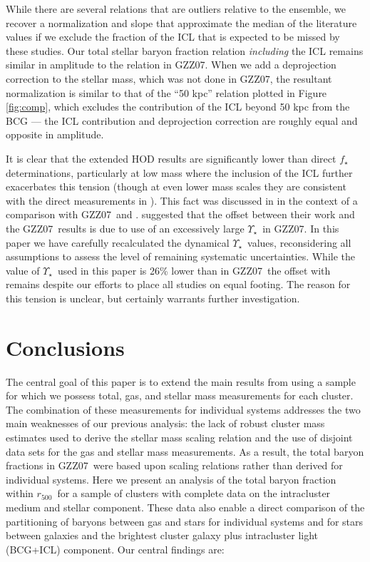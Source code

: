 \documentclass[preprint]{emulateapj}
\newcommand\rfive{$r_{500}$}
\newcommand\ptwo{GZZ07}
\newcommand{\mlrat}{$\Upsilon_\star$}
\begin{document}
While there are several relations that are outliers relative to the
ensemble, we recover a normalization and slope that approximate the
median of the literature values if we exclude the fraction of the ICL
that is expected to be missed by these studies. Our total stellar
baryon fraction relation \emph{including} the ICL remains similar in
amplitude to the relation in \ptwo. When we add a deprojection
correction to the stellar mass, which was not done in \ptwo, the
resultant normalization is similar to that of the ``50 kpc'' relation
plotted in Figure \ref{fig:comp}, which excludes the contribution of
the ICL beyond 50 kpc from the BCG --- the ICL contribution and
deprojection correction are roughly equal and opposite in amplitude.

It is clear that the \citet{leauthaud2012} extended HOD results are
significantly lower than direct $f_\star$ determinations, particularly
at low mass where the inclusion of the ICL further exacerbates this
tension (though at even lower mass scales they are consistent with the
direct measurements in \citet{leauthaud2012}).  This fact was
discussed in \citet{leauthaud2012} in the context of a comparison with
\ptwo\ and \citet{giodini2009}.  \citet{leauthaud2012} suggested that
the offset between their work and the \ptwo\ results is due to use of
an excessively large \mlrat\ in \ptwo.  In this paper we have
carefully recalculated the dynamical \mlrat\ values, reconsidering all
assumptions to assess the level of remaining systematic
uncertainties. While the value of \mlrat\ used in this paper is 26\%
lower than in \ptwo\, the offset with \citet{leauthaud2012} remains
despite our efforts to place all studies on equal footing. The reason
for this tension is unclear, but certainly warrants further
investigation.


\section{Conclusions}
\label{sec:summary}

The central goal of this paper is to extend the main
results from \citet{gonzalez2007} using a sample for which we possess
total, gas, and stellar mass measurements for each cluster. The
combination of these measurements for individual systems addresses the
two main weaknesses of our previous analysis: the lack of robust
cluster mass estimates used to derive the stellar mass scaling
relation and the use of disjoint data sets for the gas and stellar
mass measurements. As a result, 
the total baryon fractions in \ptwo\ were based upon scaling relations
rather than derived for individual systems.  Here we present an
analysis of the total baryon fraction within \rfive\ for a sample of
clusters with complete data on the intracluster medium and stellar
component.  These data also enable a direct comparison of the
partitioning of baryons between gas and stars for individual systems
and for stars between galaxies and the brightest cluster galaxy plus intracluster light (BCG+ICL) component.  Our central findings
are:
\end{document}
